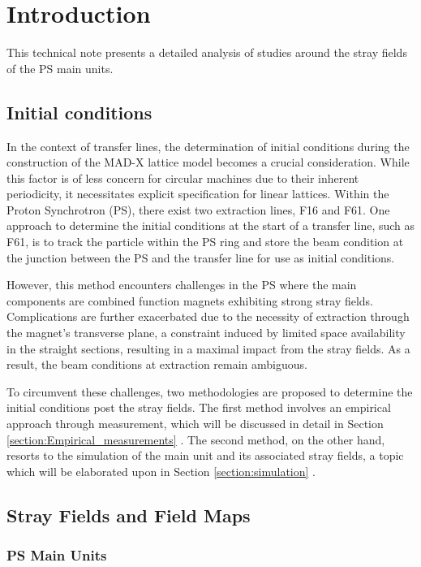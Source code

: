 \section{Introduction}

This technical note presents a detailed analysis of studies around the stray fields of the PS main units.

\subsection{Initial conditions}

In the context of transfer lines, the determination of initial conditions during the construction of the MAD-X lattice model becomes a crucial consideration. While this factor is of less concern for circular machines due to their inherent periodicity, it necessitates explicit specification for linear lattices. Within the Proton Synchrotron (PS), there exist two extraction lines, F16 and F61. One approach to determine the initial conditions at the start of a transfer line, such as F61, is to track the particle within the PS ring and store the beam condition at the junction between the PS and the transfer line for use as initial conditions.

However, this method encounters challenges in the PS where the main components are combined function magnets exhibiting strong stray fields. Complications are further exacerbated due to the necessity of extraction through the magnet's transverse plane, a constraint induced by limited space availability in the straight sections, resulting in a maximal impact from the stray fields. As a result, the beam conditions at extraction remain ambiguous.

To circumvent these challenges, two methodologies are proposed to determine the initial conditions post the stray fields. The first method involves an empirical approach through measurement, which will be discussed in detail in Section \ref{section:Empirical_measurements} . The second method, on the other hand, resorts to the simulation of the main unit and its associated stray fields, a topic which will be elaborated upon in Section \ref{section:simulation} .

\subsection{Stray Fields and Field Maps}
\subsubsection{PS Main Units}


